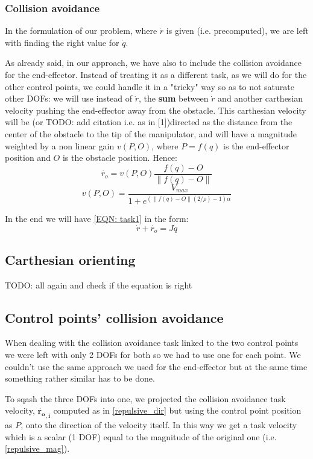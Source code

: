 \documentclass[12pt,a4paper, twocolumn, twoside]{article}
\begin{document}
\subsubsection{Collision avoidance}
In the formulation of our problem, where $\dot{r}$ is given (i.e. precomputed), we are left with finding the right value for $\dot{q}$.

As already said, in our approach, we have also to include the collision avoidance for the end-effector. Instead of treating it as a different task, as we will do for the other control points, we could handle it in a "tricky" way so as to not saturate other DOFs: we will use instead of $\dot{r}$, the \textbf{sum} between $\dot{r}$ and another carthesian velocity pushing the end-effector away from the obstacle. This carthesian velocity will be (or TODO: add citation i.e. as in [1])directed as the distance from the center of the obstacle to the tip of the manipulator, and will have a magnitude weighted by a non linear gain $v(P,O)$, where $P = f(q)$ is the end-effector position and $O$ is the obstacle position.
Hence:
\begin{equation}\label{repulsive_dir}
\dot{r_o} = v(P,O)\frac{f(q) - O}{\lVert f(q) - O \rVert}
\end{equation}
\begin{equation}\label{repulsive_mag}
v(P,O) = \frac{V_{max}}{1+e^{(\lVert f(q) -O \rVert(2/\rho)-1)\alpha}}
\end{equation}

In the end we will have \eqref{EQN: task1} in the form: 
\[
\dot{r} + \dot{r_o} = J\dot{q}
\]
\subsection[Task 2]{Carthesian orienting}
TODO: all again and check if the equation is right
\subsection[Tasks 3 \& 4]{Control points' collision avoidance}
When dealing with the collision avoidance task linked to the two control points we were left with only 2 DOFs for both so we had to use one for each point. We couldn't use the same approach we used for the end-effector but at the same time something rather similar has to be done. 

To sqash the three DOFs into one, we projected the collision avoidance task velocity, $\mathbf{\dot{r_{o}}_{,i}}$ computed as in \eqref{repulsive_dir} but using the control point position as $P$, onto the direction of the velocity itself. In this way we get a task velocity which is a scalar (1 DOF) equal to the magnitude of the original one (i.e. \eqref{repulsive_mag}).
\end{document}
